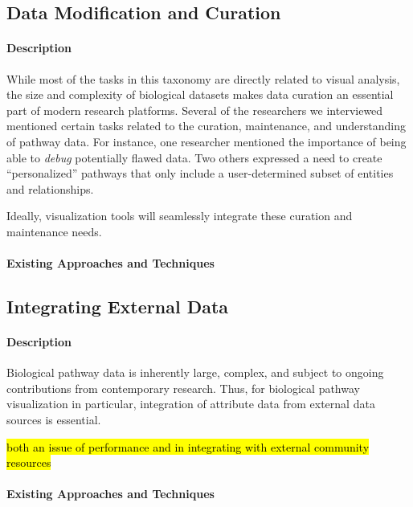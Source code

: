 \subsection{Data Modification and Curation}

\paragraph{Description}

While most of the tasks in this taxonomy are directly related to visual analysis, the size and complexity of biological datasets makes data curation an essential part of modern research platforms.
Several of the researchers we interviewed mentioned certain tasks related to the curation, maintenance, and understanding of pathway data.
For instance, one researcher mentioned the importance of being able to \emph{debug} potentially flawed data.
Two others expressed a need to create ``personalized'' pathways that only include a user-determined subset of entities and relationships.

Ideally, visualization tools will seamlessly integrate these curation and maintenance needs.

\paragraph{Existing Approaches and Techniques}

\subsection{Integrating External Data}

\paragraph{Description}

Biological pathway data is inherently large, complex, and subject to ongoing contributions from contemporary research.
Thus, for biological pathway visualization in particular, integration of attribute data from external data sources is essential.

\hl{both an issue of performance and in integrating with external community resources}

\paragraph{Existing Approaches and Techniques}

